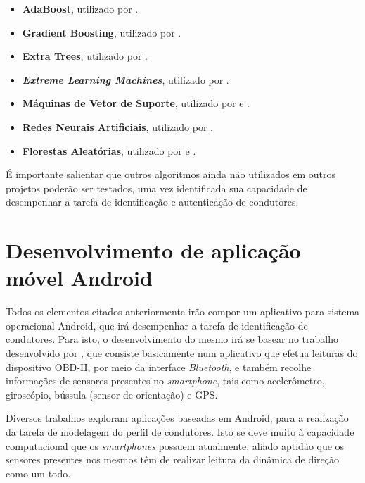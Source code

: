 \begin{itemize}
    \item \textbf{AdaBoost}, utilizado por .
    
    \item \textbf{Gradient Boosting}, utilizado por .
    
    \item \textbf{Extra Trees}, utilizado por .
    
    \item \textbf{\textit{Extreme Learning Machines}}, utilizado por .
    
    
    \item \textbf{Máquinas de Vetor de Suporte}, utilizado por  e .
    
    \item \textbf{Redes Neurais Artificiais}, utilizado por .
    
    \item \textbf{Florestas Aleatórias}, utilizado por  e .

\end{itemize}

É importante salientar que outros algoritmos ainda não utilizados em outros projetos poderão ser testados, uma vez identificada sua capacidade de desempenhar a tarefa de identificação e autenticação de condutores.

\section{Desenvolvimento de aplicação móvel Android}

Todos os elementos citados anteriormente irão compor um aplicativo para sistema operacional Android, que irá desempenhar a tarefa de identificação de condutores. Para isto, o desenvolvimento do mesmo irá se basear no trabalho desenvolvido por , que consiste basicamente num aplicativo que efetua leituras do dispositivo OBD-II, por meio da interface \textit{Bluetooth}, e também recolhe informações de sensores presentes no \textit{smartphone}, tais como acelerômetro, giroscópio, bússula (sensor de orientação) e GPS.

Diversos trabalhos exploram aplicações baseadas em Android, para a realização da tarefa de modelagem do perfil de condutores. Isto se deve muito à capacidade computacional que os \textit{smartphones} possuem atualmente, aliado aptidão que os sensores presentes nos mesmos têm de realizar leitura da dinâmica de direção como um todo.

